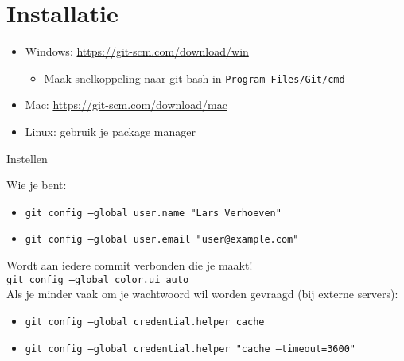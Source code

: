 \section{Installatie}

\begin{frame}
	\begin{itemize}
		\item Windows: \url{https://git-scm.com/download/win}
			\begin{itemize}
				\item \small{Maak snelkoppeling naar git-bash in \tt{Program Files/Git/cmd}}
			\end{itemize}
		\item Mac: \url{https://git-scm.com/download/mac}
		\item Linux: gebruik je package manager
	\end{itemize}
\end{frame}

\begin{frame}{Instellen}

	Wie je bent:
	\begin{itemize}
		\item \tt{git config --global user.name "Lars Verhoeven"}
		\item \tt{git config --global user.email "user@example.com"}
	\end{itemize}
	\alert{Wordt aan iedere commit verbonden die je maakt!}\\

	\texttt{git config --global color.ui auto}\\

	Als je minder vaak om je wachtwoord wil worden gevraagd (bij externe servers):

	\begin{itemize}
		\item \tt{git config --global credential.helper cache}
		\item \tt{git config --global credential.helper "cache --timeout=3600"}
	\end{itemize}
\end{frame}
